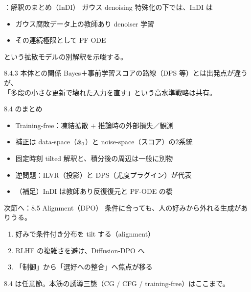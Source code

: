 \assuppl
\begin{frame}{\supplmark：解釈のまとめ（InDI）}
    ガウス denoising 特殊化の下では、InDI は
    \begin{itemize}
        \item ガウス腐敗データ上の教師あり denoiser 学習
        \item その連続極限として PF-ODE
    \end{itemize}
    という拡散モデルの別解釈を示唆する。
    \begin{block}{8.4.3 本体との関係}
        Bayes＋事前学習スコアの路線（DPS 等）とは出発点が違うが、\\
        「多段の小さな更新で壊れた入力を直す」という高水準戦略は共有。
    \end{block}
\end{frame}
\asmain
\begin{frame}{8.4 のまとめ}
    \begin{itemize}
        \item Training-free：凍結拡散 $+$ 推論時の外部損失／観測
        \item 補正は data-space（$\hat{\bm{x}}_0$）と noise-space（スコア）の2系統
        \item 固定時刻 tilted 解釈と、積分後の周辺は一般に別物
        \item 逆問題：ILVR（投影）と DPS（尤度プラグイン）が代表
        \item （補足）InDI は教師あり反復復元と PF-ODE の橋
    \end{itemize}
\end{frame}
\asmain
\begin{frame}{次節へ：8.5 Alignment（DPO）}
    条件に合っても、人の好みから外れる生成がありうる。
    \begin{enumerate}
        \item 好みで条件付き分布を tilt する（alignment）
        \item RLHF の複雑さを避け、Diffusion-DPO へ
        \item 「制御」から「選好への整合」へ焦点が移る
    \end{enumerate}
    \vfill
    \footnotesize
    8.4 は任意節。本筋の誘導三態（CG / CFG / training-free）はここまで。
\end{frame}

